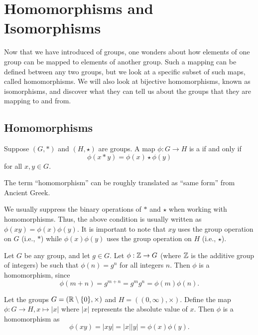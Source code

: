 \chapter{Homomorphisms and Isomorphisms}
Now that we have introduced of groups, one wonders about how elements of one group can be mapped to elements of another group. Such a mapping can be defined between any two groups, but we look at a specific subset of such maps, called homomorphisms. We will also look at bijective homomorphisms, known as isomorphisms, and discover what they can tell us about the groups that they are mapping to and from.

\section{Homomorphisms}
\begin{definition}
    Suppose $(G, \ast)$ and $(H, \star)$ are groups. A map $\phi: G \to H$ is a  if and only if
    \[
        \phi(x \ast y) = \phi(x) \star \phi(y)
    \]
    for all $x, y \in G$.
\end{definition}
\begin{remark}
    The term ``homomorphism'' can be roughly translated as ``same form'' from Ancient Greek.
\end{remark}
\begin{remark}
    We usually suppress the binary operations of $\ast$ and $\star$ when working with homomorphisms. Thus, the above condition is usually written as $\phi(xy) = \phi(x)\phi(y)$. It is important to note that $xy$ uses the group operation on $G$ (i.e., $\ast$) while $\phi(x)\phi(y)$ uses the group operation on $H$ (i.e., $\star$).
\end{remark}

\begin{example}
    Let $G$ be any group, and let $g \in G$. Let $\phi: \mathbb{Z} \to G$ (where $\mathbb{Z}$ is the additive group of integers) be such that $\phi(n) = g^n$ for all integers $n$. Then $\phi$ is a homomorphism, since
    \[
        \phi(m + n) = g^{m+n} = g^m g^n = \phi(m)\phi(n).
    \]
\end{example}

\begin{example}
    Let the groups $G = (\mathbb{R} \setminus \{0\}, \times)$ and $H = ((0,\infty),\times)$. Define the map $\phi: G \to H, x \mapsto |x|$ where $|x|$ represents the absolute value of $x$. Then $\phi$ is a homomorphism as
    \[
        \phi(xy) = |xy| = |x||y| = \phi(x)\phi(y).
    \]
\end{example}

